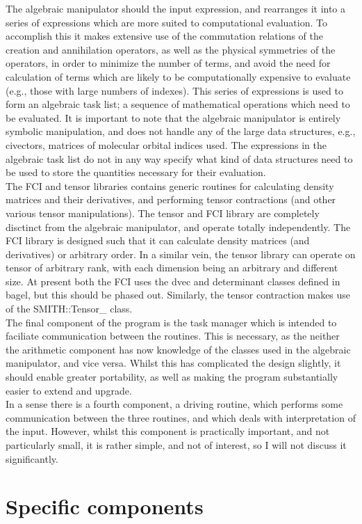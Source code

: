 \documentclass[12pt]{article}
\begin{document}
\noindent The algebraic manipulator should the input expression, and rearranges it into a series of expressions which are more suited to computational evaluation.
To accomplish this it makes extensive use of the commutation relations of the creation and annihilation operators, as well as the physical symmetries of
the operators, in order to minimize the number of terms, and avoid the need for calculation of terms which are likely to be computationally expensive to evaluate (e.g., those 
with large numbers of indexes). This series of expressions is used to form an algebraic task list; a sequence of mathematical operations which need to be evaluated.
It is important to note that the algebraic manipulator is entirely symbolic manipulation, and does not handle any of the large data structures, e.g., civectors,
matrices of molecular orbital indices used. The expressions in the algebraic task list do not in any way specify what kind of data structures need to be used to store the
quantities necessary for their evaluation.\\

\noindent The FCI and tensor libraries contains generic routines for calculating density matrices and their derivatives, and performing tensor contractions (and other 
various tensor manipulations). The tensor and FCI library are completely disctinct from the algebraic manipulator, and operate totally independently. The FCI library is designed
such that it can calculate density matrices (and derivatives) or arbitrary order. In a similar vein, the tensor library can operate on tensor of arbitrary rank, with each dimension 
being an arbitrary and different size. At present both the FCI uses the dvec and determinant classes defined in bagel, but this should be phased out. Similarly, the tensor 
contraction makes use of the SMITH::Tensor\_ class. \\

\noindent The final component of the program is the task manager which is intended to faciliate communication between the routines. This is necessary, as the neither the arithmetic component 
has now knowledge of the classes used in the algebraic manipulator, and vice versa. Whilst this has complicated the design slightly, it should enable greater portability, as well
as making the program substantially easier to extend and upgrade.
\\ 
\noindent In a sense there is a fourth component, a driving routine, which performs some communication between the three routines, and which deals with interpretation of the input. However,
whilst this component is practically important, and not particularly small, it is rather simple, and not of interest, so I will not discuss it significantly.

\section{ Specific components}
 
\end{document}
